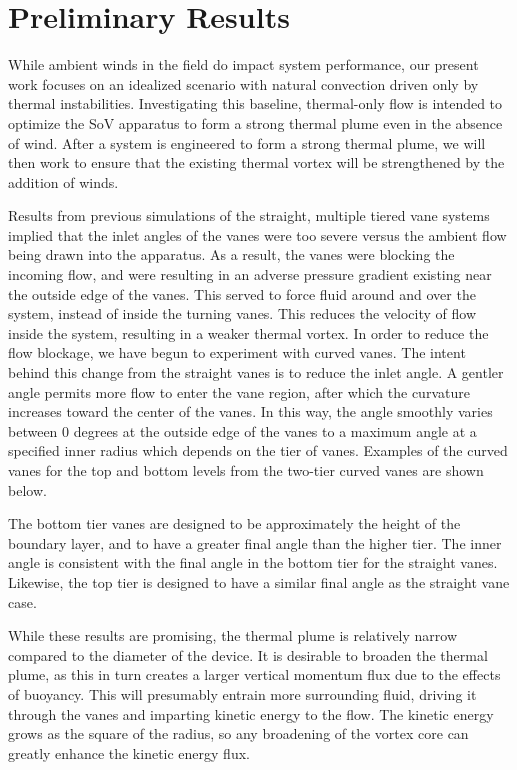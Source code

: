  
\section{Preliminary Results}
\label{sec:result}

While ambient winds in the field do impact system performance, our present work focuses on 
an idealized scenario with natural convection driven only by thermal instabilities. Investigating 
this baseline, thermal-only flow is intended to optimize the SoV apparatus to form a strong 
thermal plume even in the absence of wind. After a system is engineered to form a strong 
thermal plume, we will then work to ensure that the existing thermal vortex will be strengthened 
by the addition of winds.    

Results from previous simulations of the straight, multiple tiered vane systems implied that 
the inlet angles of the vanes were too severe versus the ambient flow being drawn into the 
apparatus. As a result, the vanes were blocking the incoming flow, and were resulting in an 
adverse pressure gradient existing near the outside edge of the vanes. This served to force fluid 
around and over the system, instead of inside the turning vanes. This reduces the velocity of flow 
inside the system, resulting in a weaker thermal vortex. 
In order to reduce the flow blockage, we have begun to experiment with curved vanes. The 
intent behind this change from the straight vanes is to reduce the inlet angle. A gentler angle 
permits more flow to enter the vane region, after which the curvature increases toward the center 
of the vanes. In this way, the angle smoothly varies between 0 degrees at the outside edge of the 
vanes to a maximum angle at a specified inner radius which depends on the tier of vanes. 
Examples of the curved vanes for the top and bottom levels from the two-tier curved vanes are 
shown below. 

The bottom tier vanes are designed to be approximately the height of the boundary layer, and 
to have a greater final angle than the higher tier. The inner angle is consistent with the final angle 
in the bottom tier for the straight vanes. Likewise, the top tier is designed to have a similar final 
angle as the straight vane case.




While these results are promising, the thermal plume is relatively narrow compared to the 
diameter of the device. It is desirable to broaden the thermal plume, as this in turn creates a 
larger vertical momentum flux due to the effects of buoyancy. This will presumably entrain more 
surrounding fluid, driving it through the vanes and imparting kinetic energy to the flow. The 
kinetic energy grows as the square of the radius, so any broadening of the vortex core can greatly 
enhance the kinetic energy flux. 

